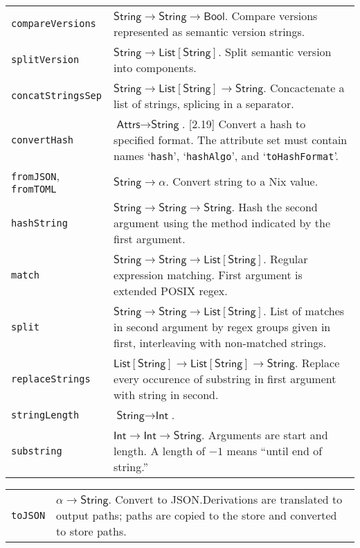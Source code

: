 \documentclass[9pt, a4paper, landscape]{extarticle}
\newcommand{\cmd}[1]{\texttt{#1}}
\newcommand{\str}{\textsf{String}}
\newcommand{\itg}{\textsf{Int}} %
\newcommand{\lst}{\textsf{List}}
\newcommand{\ats}{\textsf{Attrs}}
\newcommand{\bln}{\textsf{Bool}}
\begin{document}
\begin{multicols*}{3}
\begin{tabularx}{\columnwidth}{@{}l>{\raggedright\arraybackslash}X@{}}
  \cmd{compareVersions} & $\str\to\str\to\bln$. Compare versions
  represented as semantic version strings. \\
  
  \cmd{splitVersion} & $\str\to\lst[\str]$. Split semantic version into
  components. \\
  
  \cmd{concatStringsSep} & $\str\to\lst[\str]\to\str$. Concactenate a list
  of strings, splicing in a separator. \\

  \cmd{convertHash} & $\ats\to\str$. [2.19] Convert a hash to specified
  format. The attribute set must contain names `\cmd{hash}',
  `\cmd{hashAlgo}', and `\cmd{toHashFormat}'. \\

  \cmd{fromJSON}, \cmd{fromTOML} & $\str\to\alpha$. Convert string to a Nix
  value. \\

  \cmd{hashString} & $\str\to\str\to\str$. Hash the second argument using
  the method indicated by the first argument. \\
  
  \cmd{match} & $\str\to\str\to\lst[\str]$. Regular expression
  matching. First argument is extended POSIX regex. \\
  
  \cmd{split} & $\str\to\str\to\lst[\str]$. List of matches in second
  argument by regex groups given in first, interleaving with
  non-matched strings. \\
    
  \cmd{replaceStrings} & $\lst[\str]\to\lst[\str]\to\str$. Replace every
  occurence of substring in first argument with string in second. \\

  \cmd{stringLength} & $\str\to\itg$. \\

  \cmd{substring} & $\itg\to\itg\to\str$. Arguments are start and
  length. A length of $-1$ means ``until end of string.'' \\
\end{tabularx}

\begin{tabularx}{\columnwidth}{@{}l>{\raggedright\arraybackslash}X@{}}
    
  \cmd{toJSON} & $\alpha\to\str$. Convert to JSON.\@ Derivations are translated
  to output paths; paths are copied to the store and converted to
  store paths. \\
  

\end{tabularx}
\end{multicols*}
\end{document}

